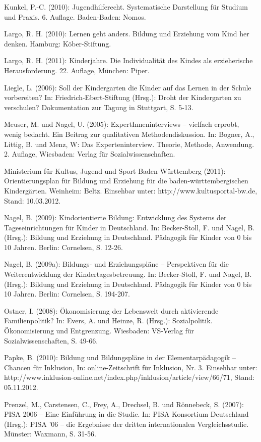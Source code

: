 Kunkel, P.-C. (2010): Jugendhilferecht. Systematische Darstellung für Studium und Praxis. 6. Auflage. Baden-Baden: Nomos. 

Largo, R. H. (2010): Lernen geht anders. Bildung und Erziehung vom Kind her denken. Hamburg: Köber-Stiftung. 

Largo, R. H. (2011): Kinderjahre. Die Individualität des Kindes als erzieherische Herausforderung. 22. Auflage, München: Piper.

Liegle, L. (2006): Soll der Kindergarten die Kinder auf das Lernen in der Schule vorbereiten? In: Friedrich-Ebert-Stiftung (Hrsg.): Droht der Kindergarten zu verschulen? Dokumentation zur Tagung in Stuttgart, S. 5-13.

Meuser, M. und Nagel, U. (2005): ExpertInneninterviews – vielfach erprobt, wenig bedacht. Ein Beitrag zur qualitativen Methodendiskussion. In: Bogner, A., Littig, B. und Menz, W: Das Experteninterview. Theorie, Methode, Anwendung. 2. Auflage, Wiesbaden: Verlag für Sozialwissenschaften.

Ministerium für Kultus, Jugend und Sport Baden-Württemberg (2011): Orientierungsplan für Bildung und Erziehung für die baden-württembergischen Kindergärten. Weinheim: Beltz. Einsehbar unter: http://www.kultusportal-bw.de, Stand: 10.03.2012.

Nagel, B. (2009): Kindorientierte Bildung: Entwicklung des Systems der Tageseinrichtungen für Kinder in Deutschland. In: Becker-Stoll, F. und Nagel, B. (Hrsg.): Bildung und Erziehung in Deutschland. Pädagogik für Kinder von 0 bis 10 Jahren. Berlin: Cornelsen, S. 12-26.

Nagel, B. (2009a): Bildungs- und Erziehungspläne – Perspektiven für die Weiterentwicklung der Kindertagesbetreuung. In: Becker-Stoll, F. und Nagel, B. (Hrsg.): Bildung und Erziehung in Deutschland. Pädagogik für Kinder von 0 bis 10 Jahren. Berlin: Cornelsen, S. 194-207.

Ostner, I. (2008): Ökonomisierung der Lebenswelt durch aktivierende Familienpolitik? In: Evers, A. und Heinze, R. (Hrsg.): Sozialpolitik. Ökonomisierung und Entgrenzung. Wiesbaden: VS-Verlag für Sozialwissenschaften, S. 49-66.

Papke, B. (2010): Bildung und Bildungspläne in der Elementarpädagogik – Chancen für Inklusion, In: online-Zeitschrift für Inklusion, Nr. 3. Einsehbar unter: http://www.inklusion-online.net/index.php/inklusion/article/view/66/71, Stand: 05.11.2012.

Prenzel, M., Carstensen, C., Frey, A., Drechsel, B. und Rönnebeck, S. (2007): PISA 2006 – Eine Einführung in die Studie. In: PISA Konsortium Deutschland (Hrsg.): PISA '06 – die Ergebnisse der dritten internationalen Vergleichsstudie. Münster: Waxmann, S. 31-56.

